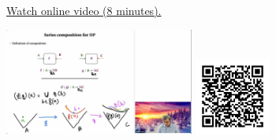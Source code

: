 
\begin{minipage}{10cm}
    \href{https://act4e-spring21.netlify.app/videos/spring2021-functorial-comp-a:solving-queries:solving-series.html}{Watch online video (8 minutes).}
        
    \href{https://act4e-spring21.netlify.app/videos/spring2021-functorial-comp-a:solving-queries:solving-series.html}{\includegraphics[height=3.5cm]{spring2021-functorial-comp-a:solving-queries:solving-series/thumbnails.jpg}}
    \href{https://act4e-spring21.netlify.app/videos/spring2021-functorial-comp-a:solving-queries:solving-series.html}{\includegraphics[height=2.5cm]{spring2021-functorial-comp-a:solving-queries:solving-series/qrcode.png}}
\end{minipage}
